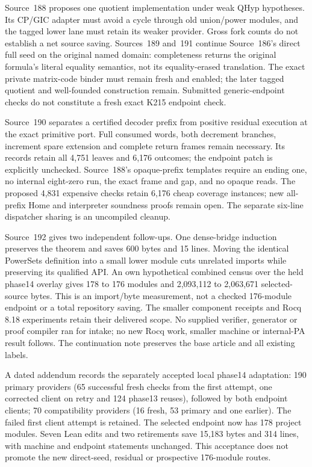\documentclass[11pt]{article}
\begin{document}
{Source~188 proposes one quotient implementation under weak QHyp hypotheses.
Its CP/GIC adapter must avoid a cycle through old union/power modules, and the
tagged lower lane must retain its weaker provider. Gross fork counts do not
establish a net source saving. Sources~189 and~191 continue Source~186's direct
full seed on the original named domain: completeness returns the original
formula's literal equality semantics, not its equality-erased translation.
The exact private matrix-code binder must remain fresh and enabled; the later
tagged quotient and well-founded construction remain. Submitted generic-endpoint
checks do not constitute a fresh exact K215 endpoint check.

Source~190 separates a certified decoder prefix from positive residual
execution at the exact primitive port. Full consumed words, both decrement
branches, increment spare extension and complete return frames remain necessary.
Its records retain all 4,751 leaves and 6,176 outcomes; the endpoint patch is
explicitly unchecked. Source~188's opaque-prefix templates require an ending
one, no internal eight-zero run, the exact frame and gap, and no opaque reads.
The proposed 4,831 expensive checks retain 6,176 cheap coverage instances;
new all-prefix Home and interpreter soundness proofs remain open. The separate
six-line dispatcher sharing is an uncompiled cleanup.

Source~192 gives two independent follow-ups. One dense-bridge induction preserves
the theorem and saves 600 bytes and 15 lines. Moving the identical PowerSets
definition into a small lower module cuts unrelated imports while preserving its
qualified API. An own hypothetical combined census over the held phase14 overlay
gives 178 to 176 modules and 2,093,112 to 2,063,671 selected-source bytes.
This is an import/byte measurement, not a checked 176-module endpoint or a total
repository saving. The smaller component receipts and Rocq 8.18 experiments
retain their delivered scope. No supplied verifier, generator or proof compiler
ran for intake; no new Rocq work, smaller machine or internal-PA result follows.
The continuation note preserves the base article and all existing labels.

A dated addendum records the separately accepted local phase14 adaptation:
190 primary providers (65 successful fresh checks from the first attempt,
one corrected client on retry and 124 phase13 reuses), followed by both endpoint
clients; 70 compatibility providers (16 fresh, 53 primary and one earlier).
The failed first client attempt is retained. The selected endpoint now has
178 project modules. Seven Lean edits and two retirements save 15,183 bytes
and 314 lines, with machine and endpoint statements unchanged. This acceptance
does not promote the new direct-seed, residual or prospective 176-module routes.


}
\end{document}
